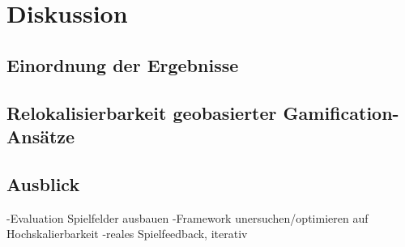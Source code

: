 \chapter{Diskussion}
\label{sec:S7_Diskussion}

\section{Einordnung der Ergebnisse}

\section{Relokalisierbarkeit geobasierter Gamification-Ansätze}

\section{Ausblick}

-Evaluation Spielfelder ausbauen
-Framework unersuchen/optimieren auf Hochskalierbarkeit
-reales Spielfeedback, iterativ